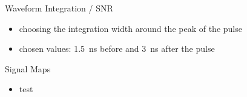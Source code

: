 \begin{frame}{Waveform Integration / SNR}
	
	
	\begin{itemize}\itemfill
		\item choosing the integration width around the peak of the pulse
		\item chosen values: \SI{1.5}{\nano\second} before and \SI{3}{\nano\second} after the pulse
	\end{itemize}
	
\end{frame}
\begin{frame}{Signal Maps}
	
	
	\begin{itemize}\itemfill
		\item test
	\end{itemize}
	
\end{frame}
